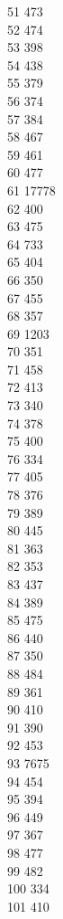 { 51	473 \\
 52	474 \\
 53	398 \\
 54	438 \\
 55	379 \\
 56	374 \\
 57	384 \\
 58	467 \\
 59	461 \\
 60	477 \\
 61	17778 \\
 62	400 \\
 63	475 \\
 64	733 \\
 65	404 \\
 66	350 \\
 67	455 \\
 68	357 \\
 69	1203 \\
 70	351 \\
 71	458 \\
 72	413 \\
 73	340 \\
 74	378 \\
 75	400 \\
 76	334 \\
 77	405 \\
 78	376 \\
 79	389 \\
 80	445 \\
 81	363 \\
 82	353 \\
 83	437 \\
 84	389 \\
 85	475 \\
 86	440 \\
 87	350 \\
 88	484 \\
 89	361 \\
 90	410 \\
 91	390 \\
 92	453 \\
 93	7675 \\
 94	454 \\
 95	394 \\
 96	449 \\
 97	367 \\
 98	477 \\
 99	482 \\
 100	334 \\
 101	410 \\
}
